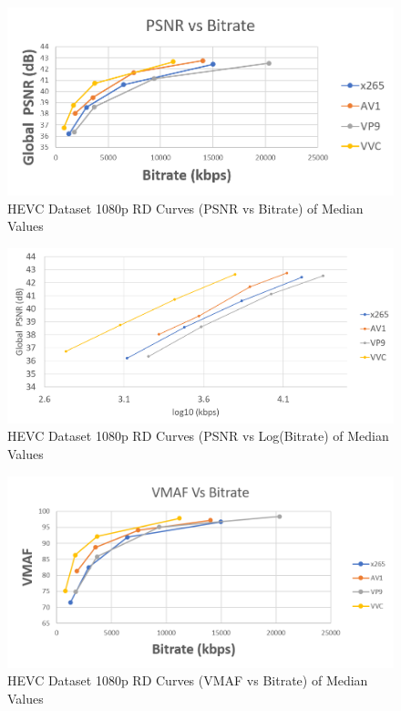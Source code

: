 \documentclass{book}
\begin{document}
\begin{figure}[hbt!]
	\centering
	\includegraphics[width=1.0\linewidth]{pictures/ch7/HEVC-1080p_BD-PSNR.png}
	\caption{HEVC Dataset 1080p RD Curves (PSNR vs Bitrate) of Median Values}
\label{fig:HEVC-1080p-PSNR}
\end{figure}


\begin{figure}[hbt!]
	\centering
	\includegraphics[width=\linewidth]{pictures/ch7/HEVC-1080p_logPSNR.png}
	\caption{HEVC Dataset 1080p RD Curves (PSNR vs Log(Bitrate) of Median Values}
	\label{fig:HEVC-1080p-logPSNR}
\end{figure}


\begin{figure}[hbt!]
	\centering
	\includegraphics[width=1.0\linewidth]{pictures/ch7/HEVC-1080p_BD-VMAF.png}
	\caption{HEVC Dataset 1080p RD Curves (VMAF vs Bitrate) of Median Values}
\label{fig:HEVC-1080p-VMAF}
\end{figure}
\end{document}
